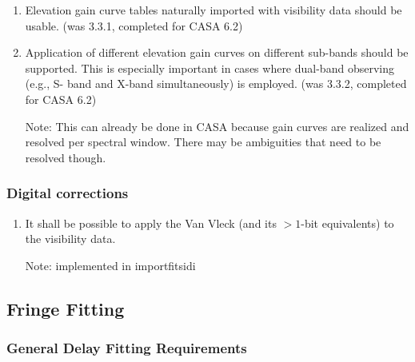 \documentclass[11pt,a4paper]{article}
\begin{document}
\begin{enumerate}[subsubseclist]

\item Elevation gain curve tables naturally imported with visibility
  data should be usable.  (was 3.3.1, completed for CASA 6.2)

\item Application of different elevation gain curves on different
  sub-bands should be supported.  This is especially important in
  cases where dual-band observing (e.g., S- band and X-band
  simultaneously) is employed.  (was 3.3.2, completed for CASA 6.2)

  Note: This can already be done in CASA because gain curves are
  realized and resolved per spectral window.  There may be ambiguities
  that need to be resolved though.

\end{enumerate}


\subsubsection{Digital corrections}

\begin{enumerate}[subsubseclist]

\item It shall be possible to apply the Van Vleck (and its $>1$-bit
  equivalents) to the visibility data.

  Note: implemented in importfitsidi

\end{enumerate}


\subsection{Fringe Fitting}

\subsubsection{General Delay Fitting Requirements}
\end{document}
